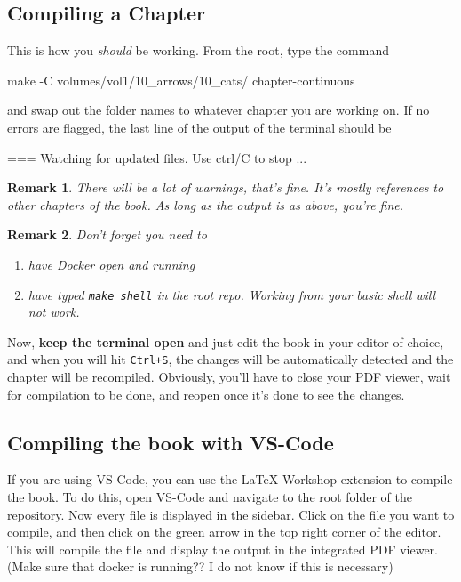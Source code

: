 \documentclass{article}
\newtheorem{remark}{Remark}
\begin{document}
\subsection{Compiling a Chapter}
This is how you \textit{should} be working. From the root, type the command
\begin{bashcode}
    make -C volumes/vol1/10_arrows/10_cats/ chapter-continuous
\end{bashcode}
and swap out the folder names to whatever chapter you are working on. If no errors are flagged, the last line of the output of the terminal should be 
\begin{bashcode}
    === Watching for updated files. Use ctrl/C to stop ...
\end{bashcode}
\begin{remark}
    There will be a lot of warnings, that's fine. It's mostly references to other chapters of the book. As long as the output is as above, you're fine.
\end{remark}
\begin{remark}
    Don't forget you need to 
    \begin{enumerate}
        \item have Docker open and running
        \item have typed \texttt{make shell} in the root repo. Working from your basic shell will not work.
    \end{enumerate}
\end{remark}
Now, \textbf{keep the terminal open} and just edit the book in your editor of choice, and when you will hit \texttt{Ctrl+S}, the changes will be automatically detected and the chapter will be recompiled. Obviously, you'll have to close your PDF viewer, wait for compilation to be done, and reopen once it's done to see the changes. 

\subsection{Compiling the book with VS-Code}
If you are using VS-Code, you can use the LaTeX Workshop extension to compile the book. To do this, open VS-Code and navigate to the root folder of the repository. Now every file is displayed in the sidebar. Click on the file you want to compile, and then click on the green arrow in the top right corner of the editor. This will compile the file and display the output in the integrated PDF viewer. (Make sure that docker is running?? I do not know if this is necessary)
\end{document}
